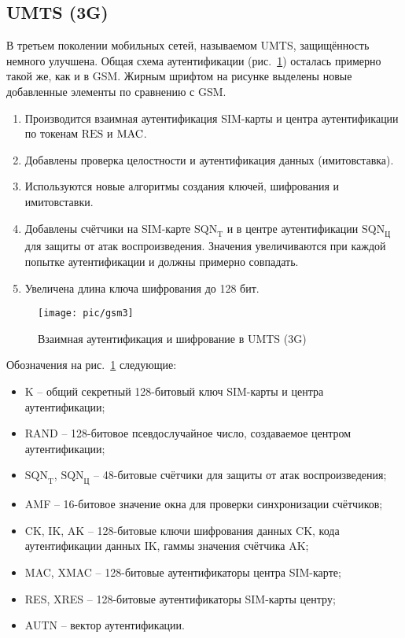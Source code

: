 \subsection{UMTS (3G)}

В третьем поколении мобильных сетей, называемом UMTS, защищённость немного улучшена. Общая схема аутентификации (рис.~\ref{fig:gsm3}) осталась примерно такой же, как и в GSM. Жирным шрифтом на рисунке выделены новые добавленные элементы по сравнению с GSM.
\begin{enumerate}
    \item Производится взаимная аутентификация SIM-карты и центра аутентификации по токенам $\textrm{RES}$ и $\textrm{MAC}$.
    \item Добавлены проверка целостности и аутентификация данных (имитовставка).
    \item Используются новые алгоритмы создания ключей, шифрования и имитовставки.
    \item Добавлены счётчики на SIM-карте $\textrm{SQN}_{\textrm{T}}$ и в центре аутентификации $\textrm{SQN}_{\textrm{Ц}}$ для защиты от атак воспроизведения. Значения увеличиваются при каждой попытке аутентификации и должны примерно совпадать.
    \item Увеличена длина ключа шифрования до 128 бит.
\end{enumerate}

\begin{figure}[!ht]
	\centering
	\texttt{[image: pic/gsm3]}
	\caption{Взаимная аутентификация и шифрование в UMTS (3G)\label{fig:gsm3}}
\end{figure}

Обозначения на рис.~\ref{fig:gsm3} следующие:
\begin{itemize}
    \item K -- общий секретный 128-битовый ключ SIM-карты и центра аутентификации;
    \item RAND -- 128-битовое псевдослучайное число, создаваемое центром аутентификации;
    \item $\textrm{SQN}_{\textrm{T}}$, $\textrm{SQN}_{\textrm{Ц}}$ -- 48-битовые счётчики для защиты от атак воспроизведения;
    \item AMF -- 16-битовое значение окна для проверки синхронизации счётчиков;
    \item CK, IK, AK -- 128-битовые ключи шифрования данных CK, кода аутентификации данных IK, гаммы значения счётчика AK;
    \item MAC, XMAC -- 128-битовые аутентификаторы центра SIM-карте;
    \item RES, XRES -- 128-битовые аутентификаторы SIM-карты центру;
    \item AUTN -- вектор аутентификации.
\end{itemize}

